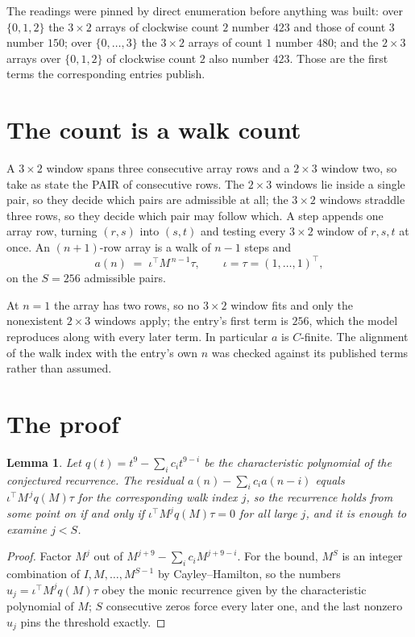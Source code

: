 \documentclass[11pt,a4paper]{article}
\theoremstyle{plain}
\newtheorem{lemma}[theorem]{Lemma}
\theoremstyle{definition}
\begin{document}
The readings were pinned by direct enumeration before anything was built: over
$\{0,1,2\}$ the $3\times2$ arrays of clockwise count $2$ number $423$ and those of count
$3$ number $150$; over $\{0,\dots,3\}$ the $3\times2$ arrays of count $1$ number $480$;
and the $2\times3$ arrays over $\{0,1,2\}$ of clockwise count $2$ also number $423$. Those
are the first terms the corresponding entries publish.

\section{The count is a walk count}

A $3\times2$ window spans three consecutive array rows and a $2\times3$
window two, so take as state the PAIR of consecutive rows. The $2\times3$ windows lie inside a
single pair, so they decide which pairs are admissible at all; the $3\times2$ windows straddle
three rows, so they decide which pair may follow which. A step appends one array row, turning
$(r,s)$ into $(s,t)$ and testing every $3\times2$ window of $r,s,t$ at once. An $(n+1)$-row
array is a walk of $n-1$ steps and
\[
a(n)\;=\;\iota^{\!\top}M^{\,n-1}\tau,\qquad\iota=\tau=(1,\dots,1)^{\!\top},
\]
on the $S=256$ admissible pairs.

At $n=1$ the array has two rows, so no $3\times2$ window fits and only the
nonexistent $2\times3$ windows apply; the entry's first term is
$256$, which the model reproduces along with every later term.
In particular $a$ is $C$-finite. The alignment of the walk index with the entry's own $n$ was
checked against its published terms rather than assumed.

\section{The proof}

\begin{lemma}\label{lem:crit}
Let $q(t)=t^{9}-\sum_i c_it^{9-i}$ be the characteristic polynomial of the
conjectured recurrence. The residual $a(n)-\sum_ic_ia(n-i)$ equals
$\iota^{\!\top}M^{\,j}q(M)\tau$ for the corresponding walk index $j$, so the recurrence
holds from some point on if and only if $\iota^{\!\top}M^{j}q(M)\tau=0$ for all large $j$,
and it is enough to examine $j<S$.
\end{lemma}

\begin{proof}
Factor $M^{j}$ out of $M^{j+9}-\sum_ic_iM^{j+9-i}$. For the bound, $M^{S}$
is an integer combination of $I,M,\dots,M^{S-1}$ by Cayley--Hamilton, so the numbers
$u_j=\iota^{\!\top}M^{j}q(M)\tau$ obey the monic recurrence given by the characteristic
polynomial of $M$; $S$ consecutive zeros force every later one, and the last nonzero $u_j$
pins the threshold exactly.
\end{proof}
\end{document}

